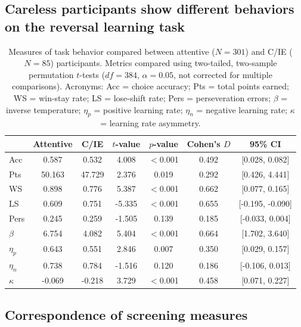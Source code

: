 \documentclass[a4paper,notitlepage,12pt]{article}
\begin{document}
\subsection*{Careless participants show different behaviors on the reversal learning task}
\begin{table}[H]
    \centering
    \begin{tabular}{lcccccc}
    \toprule
    {} &  Attentive &    C/IE &   $t$-value &   $p$-value &  Cohen's $D$ & 95\% CI \\
    \midrule
    Acc      &      0.587 &   0.532 &  4.008 &  $<$0.001 &  0.492 &    [0.028, 0.082] \\
    Pts      &     50.163 &  47.729 &  2.376 &     0.019 &  0.292 &    [0.426, 4.441] \\
    WS       &      0.898 &   0.776 &  5.387 &  $<$0.001 &  0.662 &    [0.077, 0.165] \\
    LS       &      0.609 &   0.751 & -5.335 &  $<$0.001 &  0.655 &  [-0.195, -0.090] \\
    Pers     &      0.245 &   0.259 & -1.505 &     0.139 &  0.185 &   [-0.033, 0.004] \\
    $\beta$  &      6.754 &   4.082 &  5.404 &  $<$0.001 &  0.664 &    [1.702, 3.640] \\
    $\eta_p$ &      0.643 &   0.551 &  2.846 &     0.007 &  0.350 &    [0.029, 0.157] \\
    $\eta_n$ &      0.738 &   0.784 & -1.516 &     0.120 &  0.186 &   [-0.106, 0.013] \\
    $\kappa$ &     -0.069 &  -0.218 &  3.729 &  $<$0.001 &  0.458 &    [0.071, 0.227] \\
    \bottomrule
    \end{tabular}
    \caption{Measures of task behavior compared between attentive ($N=301$) and C/IE ($N=85$) participants. Metrics compared using two-tailed, two-sample permutation $t$-tests ($df=384$, $\alpha = 0.05$, not corrected for multiple comparisons). Acronyms: Acc = choice accuracy; Pts = total points earned; WS = win-stay rate; LS = lose-shift rate; Pers = perseveration errors; $\beta$ = inverse temperature; $\eta_p$ = positive learning rate; $\eta_n$ = negative learning rate; $\kappa$ = learning rate asymmetry.}
    \label{tab:tabS02}
\end{table}

\clearpage
\subsection*{Correspondence of screening measures}
\end{document}
